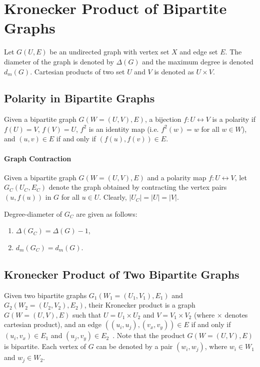 
\section{Kronecker Product of Bipartite Graphs}
Let $G(U,E)$ be an undirected graph with vertex set $X$ and edge set $E$. The diameter of the graph is
denoted by $\Delta(G)$ and the maximum degree is
denoted $d_{m}(G)$. Cartesian products of two set $U$ and $V$ is denoted as $U\times V$.

\subsection{Polarity in Bipartite Graphs}
\begin{definition}[Polarity]\label{defn:polarity}
Given a bipartite graph $G(W=(U,V),E)$, a bijection $f:U\leftrightarrow V$ is a polarity if $f(U)=V$, $f(V)=U$, $f^2$ is an identity map (i.e. $f^2(w)=w$ for all $w\in W$), and $(u,v)\in E$ if and only if $(f(u),f(v))\in E$.
\end{definition}

\paragraph{Graph Contraction}
Given a bipartite graph $G(W=(U,V),E)$ and a polarity map $f:U\leftrightarrow V$, let $G_C(U_C, E_C)$ denote the graph
obtained by contracting the vertex pairs $(u, f(u))$ in $G$ for all $u\in U$.
Clearly, $|U_C| = |U| = |V|$.

Degree-diameter of $G_C$ are given as follows:
\begin{enumerate}
    \item $\Delta(G_C)=\Delta(G)-1$,  
    \item $d_{m}(G_C)=d_{m}(G)$.
\end{enumerate}


\subsection{Kronecker Product of Two Bipartite Graphs}
Given two bipartite graphs $G_1(W_1=(U_1,V_1),E_1)$ and 
$G_2(W_2=(U_2,V_2),E_2)$, their Kronecker product is a  
graph $G(W=(U,V),E)$ such that $U=U_1\times U_2$ and 
$V=V_1\times V_2$ (where $\times$ denotes cartesian 
product), and an edge $((u_i, u_j), (v_x,v_y))\in E$
if and only if $(u_i,v_x)\in E_1$ and $(u_j, v_y)\in E_2$~\cite{delorme1985large}. 
Note that the product $G(W=(U,V),E)$ is bipartite.
Each vertex of $G$ can be denoted by a pair $(w_i, w_j)$, where $w_i\in W_1$ and $w_j\in W_2$.

